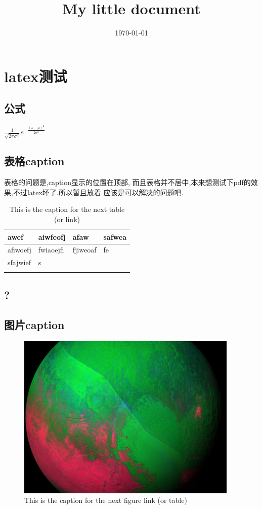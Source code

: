 \documentclass[11pt]{article}
\date{\today}
\title{My little document}
\begin{document}
\maketitle
\tableofcontents

\section{latex测试}
\label{sec:orgheadline11}
\subsection{公式}
\label{sec:orgheadline1}
\(\frac{1}{\sqrt{2\pi\sigma^2}}e^{ -\frac{(x-\mu)^2}{2\sigma^2} }\)
\subsection{表格caption}
\label{sec:orgheadline2}
    表格的问题是,caption显示的位置在顶部,
    而且表格并不居中,本来想测试下pdf的效果,不过latex坏了.所以暂且放着
应该是可以解决的问题吧.

\begin{table}[htb]
\caption{\label{tab:orgtable1}
This is the caption for the next table (or link)}
\centering
\begin{tabular}{llll}
awef & aiwfeofj & afaw & safwea\\
\hline
afiwoefj & fwiaoejfi & fjiweoaf & fe\\
sfajwief & s &  & \\
 &  &  & \\
\end{tabular}
\end{table}

\subsection{?}
\label{sec:orgheadline3}
\subsection{图片caption}
\label{sec:orgheadline4}

\begin{figure}[htb]
\centering
\includegraphics[width=.9\linewidth]{img/1.jpg}
\caption{\label{fig:orgparagraph1}
This is the caption for the next figure link (or table)}
\end{figure}
\end{document}
